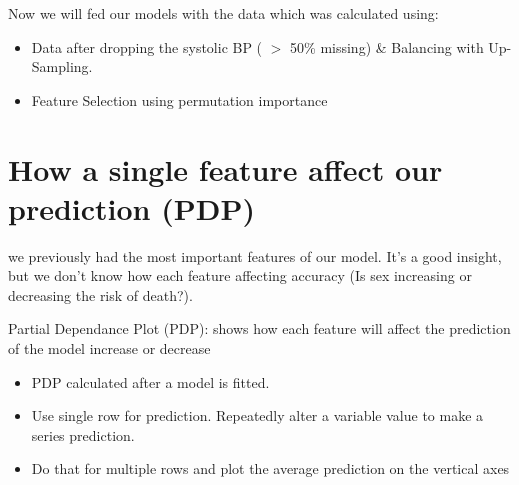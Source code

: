 \documentclass[5 pt]{article}
\begin{document}
Now we will fed our models with the data which was calculated using:
\begin{itemize}
    \item Data after dropping the systolic BP ( \(>\) 50\% missing) \& Balancing with Up-Sampling.
    \item Feature Selection using permutation importance
\end{itemize}




\section{How a single feature affect our prediction (PDP)}
we previously had the most important features of our model. It's a good insight, but we don't know how each feature affecting accuracy (Is sex increasing or decreasing the risk of death?).

Partial Dependance Plot (PDP): shows how each feature will affect the prediction of the model increase or decrease
\begin{itemize}
    \item PDP calculated after a model is fitted.
    \item Use single row for prediction. Repeatedly alter a variable value to make a series prediction.
    \item  Do that for multiple rows and plot the average prediction on the vertical axes
\end{itemize}
\end{document}
